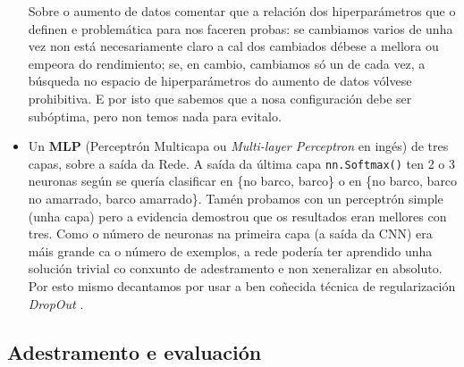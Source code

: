 \documentclass{article}
\begin{document}
\begin{itemize}
Sobre o aumento de datos comentar que a relación dos hiperparámetros que o definen e problemática para nos faceren probas: se cambiamos varios de unha vez non está necesariamente claro a cal dos cambiados débese a mellora ou empeora do rendimiento; se, en cambio, cambiamos só un de cada vez, a búsqueda no espacio de hiperparámetros do aumento de datos vólvese prohibitiva. E por isto que sabemos que a nosa configuración debe ser subóptima, pero non temos nada para evitalo.
\item Un \textbf{MLP} (Perceptrón Multicapa ou \emph{Multi-layer Perceptron} en ingés) de tres capas, sobre a saída da Rede. A saída da última capa \texttt{nn.Softmax()} ten 2 o 3 neuronas según se quería clasificar en \{no barco, barco\} o en \{no barco, barco no amarrado, barco amarrado\}. Tamén probamos con un perceptrón simple (unha capa) pero a evidencia demostrou que os resultados eran mellores con tres. Como o número de neuronas na primeira capa (a saída da CNN) era máis grande ca o número de exemplos, a rede podería ter aprendido unha solución trivial co conxunto de adestramento e non xeneralizar en absoluto. Por esto mismo decantamos por usar a ben coñecida técnica de regularización \emph{DropOut} \cite{srivastava2014dropout}. 
\end{itemize}

\subsection{Adestramento e evaluación}
\end{document}
